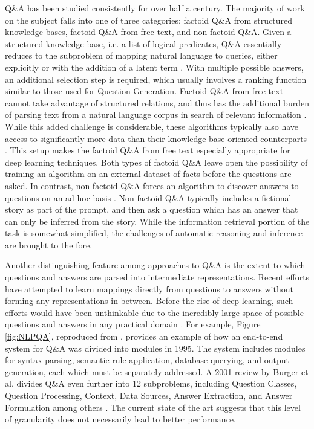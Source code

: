 Q\&A has been studied consistently for over half a century. The majority of work on the subject falls into one of three categories: factoid Q\&A from structured knowledge bases, factoid Q\&A from free text, and non-factoid Q\&A. Given a structured knowledge base, i.e. a list of logical predicates, Q\&A essentially reduces to the subproblem of mapping natural language to queries, either explicitly or with the addition of a latent term  \citep{yao2014information, zelle1996learning}. With multiple possible answers, an additional selection step is required, which usually involves a ranking function similar to those used for Question Generation. Factoid Q\&A from free text cannot take advantage of structured relations, and thus has the additional burden of parsing text from a natural language corpus in search of relevant information  \citep{ravichandran2002learning}. While this added challenge is considerable, these algorithms typically also have access to significantly more data than their knowledge base oriented counterparts  \citep{brill2001data, hermann2015teaching}. This setup makes the factoid Q\&A from free text especially appropriate for deep learning techniques. Both types of factoid Q\&A leave open the possibility of training an algorithm on an external dataset of facts before the questions are asked. In contrast, non-factoid Q\&A forces an algorithm to discover answers to questions on an ad-hoc basis  \citep{soricut2004automatic}. Non-factoid Q\&A typically includes a fictional story as part of the prompt, and then ask a question which has an answer that can only be inferred from the story. While the information retrieval portion of the task is somewhat simplified, the challenges of automatic reasoning and inference are brought to the fore.

Another distinguishing feature among approaches to Q\&A is the extent to which questions and answers are parsed into intermediate representations. Recent efforts have attempted to learn mappings directly from questions to answers without forming any representations in between. Before the rise of deep learning, such efforts would have been unthinkable due to the incredibly large space of possible questions and answers in any practical domain  \citep{hirschman2001natural}. For example, Figure \ref{fig:NLPQA}, reproduced from  \citep{androutsopoulos1995natural}, provides an example of how an end-to-end system for Q\&A was divided into modules in 1995. The system includes modules for syntax parsing, semantic rule application, database querying, and output generation, each which must be separately addressed. A 2001 review by Burger et al. divides Q\&A even further into 12 subproblems, including Question Classes, Question Processing, Context, Data Sources, Answer Extraction, and Answer Formulation among others  \citep{burger2001issues}. The current state of the art suggests that this level of granularity does not necessarily lead to better performance.  

